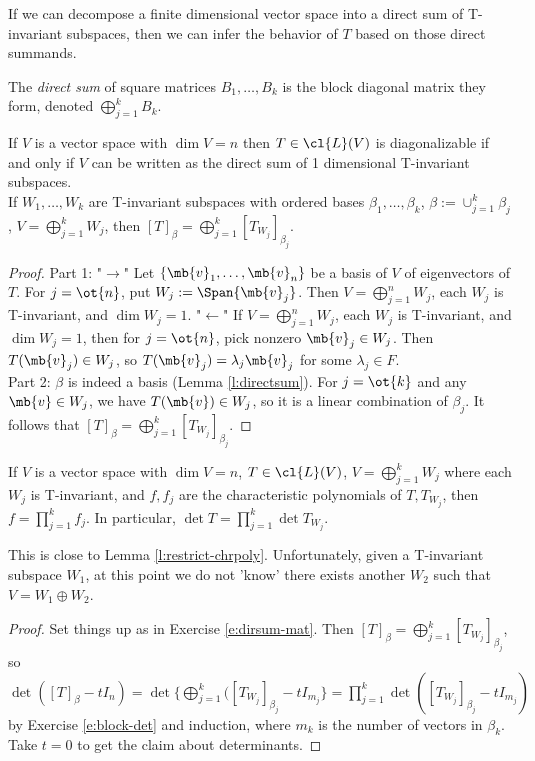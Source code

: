If we can decompose a finite dimensional vector space into a direct sum of T-invariant subspaces, then we can infer the behavior of $T$ based on those direct summands.
\begin{defn}
The \emph{direct sum} of square matrices $B_1, \ldots,B_k$ is the block diagonal matrix they form, denoted $\bigoplus_{j=1}^kB_k$.
\end{defn}
\begin{exer}\label{e:dirsum-mat}
If $V$ is a vector space with $\dim V=n$ then $T \in \cl{L}(V)$ is diagonalizable if and only if $V$ can be written as the direct sum of 1 dimensional T-invariant subspaces.\\
If $W_1, \ldots,W_k$ are T-invariant subspaces with ordered bases $\beta_1, \ldots, \beta_k$, $\beta:= \cup_{j=1}^k \beta_j$, $V= \bigoplus_{j=1}^kW_j$, then $[T]_\beta= \bigoplus_{j=1}^k[T_{W_j}]_{\beta_j}$.
\end{exer}
\begin{proof} %
Part 1: "$\to$" Let $\{ \mb{v}_1, \ldots, \mb{v}_n \}$ be a basis of $V$ of eigenvectors of $T$. For $j= \ot{n}$, put $W_j:= \Span \{ \mb{v}_j \}$. Then $V= \bigoplus_{j=1}^nW_j$, each $W_j$ is T-invariant, and $\dim W_j=1$.
"$\leftarrow$" If $V= \bigoplus_{j=1}^nW_j$, each $W_j$ is T-invariant, and $\dim W_j=1$, then for $j= \ot{n}$, pick nonzero $\mb{v}_j \in W_j$. Then $T( \mb{v}_j) \in W_j$, so $T( \mb{v}_j)= \lambda_j \mb{v}_j$ for some $\lambda_j \in F$.\\
Part 2: $\beta$ is indeed a basis (Lemma \ref{l:directsum}).%
For $j= \ot{k}$ and any $\mb{v}\in W_j$, we have $T( \mb{v}) \in W_j$, so it is a linear combination of $\beta_j$. It follows that $[T]_\beta= \bigoplus_{j=1}^k[T_{W_j}]_{\beta_j}$.
\end{proof}
\begin{lem}
If $V$ is a vector space with $\dim V=n$, $T \in \cl{L}(V)$, $V= \bigoplus_{j=1}^kW_j$ where each $W_j$ is T-invariant, and $f,f_j$ are the characteristic polynomials of $T,T_{W_j}$, then $f= \prod_{j=1}^kf_j$. In particular, $\det T= \prod_{j=1}^k \det T_{W_j}$.
\end{lem}
This is close to Lemma \ref{l:restrict-chrpoly}. Unfortunately, given a T-invariant subspace $W_1$, at this point we do not 'know' there exists another $W_2$ such that $V=W_1 \oplus W_2$.
\begin{proof}%
Set things up as in Exercise \ref{e:dirsum-mat}. Then $[T]_\beta= \bigoplus_{j=1}^k[T_{W_j}]_{\beta_j}$, so $\det([T]_\beta -tI_n)= \det \big\{ \bigoplus_{j=1}^k([T_{W_j}]_{\beta_j}-tI_{m_j} \big\} = \prod_{j=1}^k \det ([T_{W_j}]_{\beta_j}-tI_{m_j})$ by Exercise \ref{e:block-det} and induction, where $m_k$ is the number of vectors in $\beta_k$.
Take $t=0$ to get the claim about determinants.
\end{proof}
